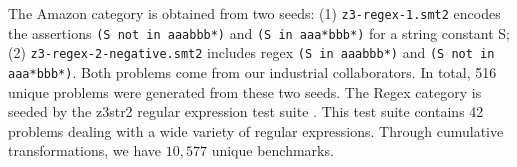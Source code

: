 \begin{table}[t]
\centering
\caption{Transformed problem sets generated by \transformer{}.}
\label{tbl:transformed}
{
  \footnotesize
  \bgroup
  \def\arraystretch{1}
  \egroup
  \vspace{-0.2in}
}
\end{table}  
    

The Amazon category is obtained from two seeds: (1)
\texttt{z3-regex-1.smt2} encodes the assertions \texttt{(S not in
  aaabbb*)} and \texttt{(S in aaa*bbb*)} for a string constant S; (2)
\texttt{z3-regex-2-negative.smt2} includes regex \texttt{(S in
  aaabbb*)} and \texttt{(S not in aaa*bbb*)}.  Both problems come from
our industrial collaborators. In total, 516 unique problems were
generated from these two seeds. The Regex category is seeded by the
z3str2 regular expression test suite \cite{z3str2-tests}.  This test
suite contains 42 problems dealing with a wide variety of regular
expressions.  Through cumulative transformations, we have $10,577$
unique benchmarks.


